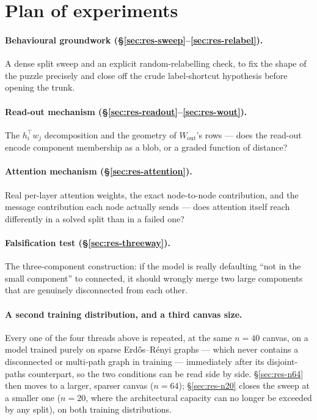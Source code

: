 \documentclass[11pt,a4paper]{article}
\begin{document}
\section{Plan of experiments}
\label{sec:plan}

\paragraph{Behavioural groundwork (\S\ref{sec:res-sweep}--\ref{sec:res-relabel}).} A
dense split sweep and an explicit random-relabelling check, to fix the shape of the
puzzle precisely and close off the crude label-shortcut hypothesis before opening
the trunk.

\paragraph{Read-out mechanism (\S\ref{sec:res-readout}--\ref{sec:res-wout}).} The
$h_i^\top w_j$ decomposition and the geometry of $W_{\mathrm{out}}$'s rows ---
does the read-out encode component membership as a blob, or a graded function of
distance?

\paragraph{Attention mechanism (\S\ref{sec:res-attention}).} Real per-layer
attention weights, the exact node-to-node contribution, and the message
contribution each node actually sends --- does attention itself reach
differently in a solved split than in a failed one?

\paragraph{Falsification test (\S\ref{sec:res-threeway}).} The three-component
construction: if the model is really defaulting ``not in the small component'' to
connected, it should wrongly merge two large components that are genuinely
disconnected from each other.

\paragraph{A second training distribution, and a third canvas size.} Every one of the four
threads above is repeated, at the same $n=40$ canvas, on a model trained purely on sparse
Erd\H{o}s--R\'enyi graphs --- which never contains a disconnected or multi-path graph in
training --- immediately after its disjoint-paths counterpart, so the two conditions can be
read side by side. \S\ref{sec:res-n64} then moves to a larger, sparser canvas ($n=64$);
\S\ref{sec:res-n20} closes the sweep at a smaller one ($n=20$, where the architectural
capacity can no longer be exceeded by any split), on both training distributions.
\end{document}
